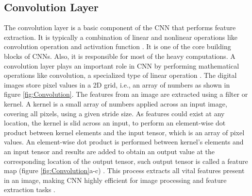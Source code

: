 \subsection{Convolution Layer}
The convolution layer is a basic component of the \ac{CNN} that performs feature extraction. It is typically a combination of linear and nonlinear operations like convolution operation and activation function \cite{articleCNNs}. It is one of the core building blocks of \acp{CNN}. Also, it is responsible for most of the heavy computations. A convolution layer plays an important role in \ac{CNN} by performing mathematical operations like convolution, a specialized type of linear operation \cite{articleCNNs}. The digital images store pixel values in a \ac{2D} grid, i.e., an array of numbers as shown in figure \ref{fig:Convolution}. The features from an image are extracted using a filter or kernel. A kernel is a small array of numbers applied across an input image, covering all pixels, using a given stride size. As features could exist at any location, the kernel is slid across an input, to perform an element-wise dot product between kernel elements and the input tensor, which is an array of pixel values. An element-wise dot product is performed between kernel's elements and an input tensor and results are added to obtain an output value at the corresponding location of the output tensor, such output tensor is called a feature map (figure \ref{fig:Convolution}a-c) \cite{articleCNNs}. This process extracts all vital features present in an image, making \ac{CNN} highly efficient for image processing and feature extraction tasks \cite{articleCNNs}.


